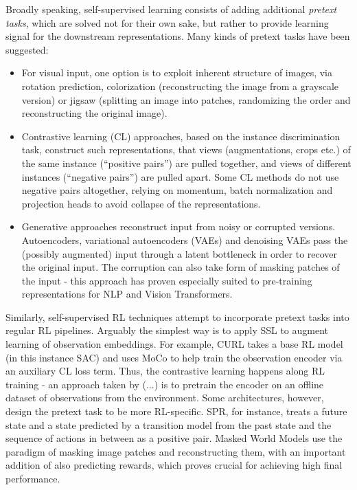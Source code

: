 \documentclass[twoside,11pt]{article}
\begin{document}
Broadly speaking, self-supervised learning consists of adding additional \emph{pretext tasks}, which are solved not for their own sake, but rather to provide learning signal for the downstream representations. Many kinds of pretext tasks have been suggested:

\begin{itemize}
  \item For visual input, one option is to exploit inherent structure of images, via rotation prediction, colorization (reconstructing the image from a grayscale version) or jigsaw (splitting an image into patches, randomizing the order and reconstructing the original image).
  \item Contrastive learning (CL) approaches, based on the instance discrimination task, construct such representations, that views (augmentations, crops etc.) of the same instance (``positive pairs'') are pulled together, and views of different instances (``negative pairs'') are pulled apart. Some CL methods do not use negative pairs altogether, relying on momentum, batch normalization and projection heads to avoid collapse of the representations.
  \item Generative approaches reconstruct input from noisy or corrupted versions. Autoencoders, variational autoencoders (VAEs) and denoising VAEs pass the (possibly augmented) input through a latent bottleneck in order to recover the original input. The corruption can also take form of masking patches of the input - this approach has proven especially suited to pre-training representations for NLP and Vision Transformers.
\end{itemize}

Similarly, self-supervised RL techniques attempt to incorporate pretext tasks into regular RL pipelines. Arguably the simplest way is to apply SSL to augment learning of observation embeddings. For example, CURL takes a base RL model (in this instance SAC) and uses MoCo to help train the observation encoder via an auxiliary CL loss term. Thus, the contrastive learning happens along RL training - an approach taken by (...) is to pretrain the encoder on an offline dataset of observations from the environment. Some architectures, however, design the pretext task to be more RL-specific. SPR, for instance, treats a future state and a state predicted by a transition model from the past state and the sequence of actions in between as a positive pair. Masked World Models use the paradigm of masking image patches and reconstructing them, with an important addition of also predicting rewards, which proves crucial for achieving high final performance.
\end{document}
